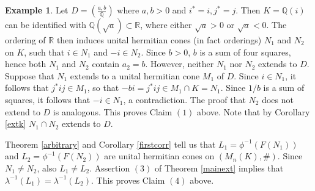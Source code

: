 \documentclass[12pt,reqno]{amsart}
\theoremstyle{definition}
\newtheorem{ex}{Example}
\providecommand{\RR}{\mathbb{R}}
\providecommand{\QQ}{\mathbb{Q}}
\begin{document}
\begin{ex}
\label{simpex}
Let $D = \left( \frac{a, b}{\QQ} \right)$ where $a,b>0$ and $i^\ast=i,j^\ast=j$.
Then $K=\QQ(i)$ can be identified with $\QQ(\sqrt{a}) \subset \RR$,
where either $\sqrt{a}>0$ or $\sqrt{a}<0$. The ordering of $\RR$ then induces 
unital hermitian cones (in fact orderings) $N_1$ and $N_2$ on $K$, such that 
$i \in N_1$ and $-i \in N_2$. Since $b > 0$, 
$b$ is a sum of four squares, hence both $N_1$ and $N_2$ contain $a_2=b$.
However, neither $N_1$ nor $N_2$ extends to $D$. Suppose that $N_1$ extends to
a unital hermitian cone $M_1$ of $D$. Since $i \in N_1$, it follows that $j^\ast i j \in M_1$,
so that $-bi=j^\ast i j \in M_1 \cap K=N_1$. Since $1/b$ is a sum of squares, 
it follows that $-i \in N_1$, a contradiction. The proof that $N_2$
does not extend to $D$ is analogous. This proves Claim $(1)$ above.
Note that by Corollary \ref{extk} $N_1 \cap N_2$ extends to $D$.

Theorem \ref{arbitrary} and Corollary \ref{firstcorr} tell us that
$L_1 =\phi^{-1}(F(N_1))$ and $L_2 = \phi^{-1}(F(N_2))$ are 
unital hermitian cones on $(M_n(K),\#)$. Since $N_1 \ne N_2$, also $L_1 \ne L_2$.
Assertion $(3)$ of Theorem \ref{mainext} implies that $\lambda^{-1}(L_1)=\lambda^{-1}(L_2)$.
This proves Claim $(4)$ above.
\end{ex}
\end{document}
